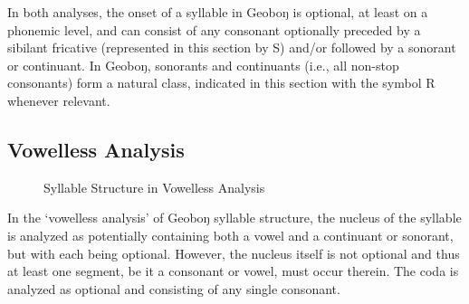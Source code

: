 \documentclass[a4paper,11pt,oneside,openany]{memoir}
\newcommand{\engma}{ŋ}
\begin{document}
In both analyses, the onset of a syllable in Geobo\engma{} is optional, at least on a phonemic level, and can consist of any consonant optionally preceded by a sibilant fricative (represented in this section by S) and/or followed by a sonorant or continuant. In Geobo\engma{}, sonorants and continuants (i.e., all non-stop consonants) form a natural class, indicated in this section with the symbol R whenever relevant.

\subsection{Vowelless Analysis}

\begin{wrapfigure}{r}{0.35\textwidth}
    \centering
    \caption{Syllable Structure in Vowelless Analysis}
    \label{fig:sylb-struc-vless}
\end{wrapfigure}

In the `vowelless analysis' of Geobo\engma{} syllable structure, the nucleus of the syllable is analyzed as potentially containing both a vowel and a continuant or sonorant, but with each being optional. However, the nucleus itself is not optional and thus at least one segment, be it a consonant or vowel, must occur therein. The coda is analyzed as optional and consisting of any single consonant.
\end{document}

